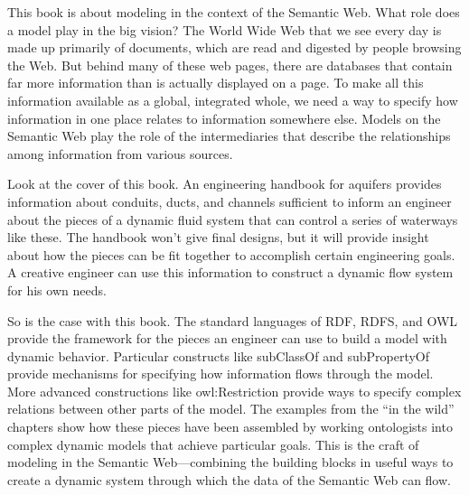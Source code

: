 This book is about modeling in the context of the Semantic Web. What
role does a model play in the big vision? The World Wide Web that we see
every day is made up primarily of documents, which are read and digested
by people browsing the Web. But behind many of these web pages, there
are databases that contain far more information than is actually
displayed on a page. To make all this information available as a global,
integrated whole, we need a way to specify how information in one place
relates to information somewhere else. Models on the Semantic Web play
the role of the intermediaries that describe the relationships among
information from various sources.

Look at the cover of this book. An engineering handbook for aquifers
provides information about conduits, ducts, and channels sufficient to
inform an engineer about the pieces of a dynamic fluid system that can
control a series of waterways like these. The handbook won't give final
designs, but it will provide insight about how the pieces can be fit
together to accomplish certain engineering goals. A creative engineer
can use this information to construct a dynamic flow system for his own
needs.

So is the case with this book. The standard languages of RDF, RDFS, and
OWL provide the framework for the pieces an engineer can use to build a
model with dynamic behavior. Particular constructs like subClassOf and
subPropertyOf provide mechanisms for specifying how information flows
through the model. More advanced constructions like owl:Restriction
provide ways to specify complex relations between other parts of the
model. The examples from the ``in the wild'' chapters show how these
pieces have been assembled by working ontologists into complex dynamic
models that achieve particular goals. This is the craft of modeling in
the Semantic Web---combining the building blocks in useful ways to
create a dynamic system through which the data of the Semantic Web can
flow.
